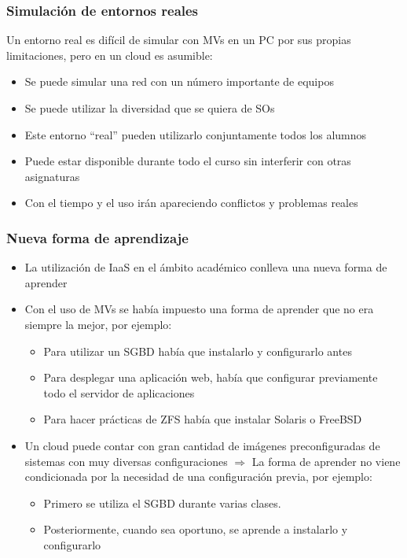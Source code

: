 \documentclass{beamer}
\begin{document}
\begin{frame}
  \frametitle{Simulación de entornos reales}
  Un entorno real es difícil de simular con MVs en un PC por sus
    propias limitaciones, pero en un cloud es asumible:
    \begin{itemize}
    \item Se puede simular una red con un número importante de equipos
    \item Se puede utilizar la diversidad que se quiera de SOs
    \item Este entorno ``real'' pueden utilizarlo conjuntamente todos los
      alumnos
    \item Puede estar disponible durante todo el curso sin interferir con otras
      asignaturas
    \item Con el tiempo y el uso irán apareciendo conflictos y problemas reales
    \end{itemize}
\end{frame}
\begin{frame}
  \frametitle{Nueva forma de aprendizaje}
  \begin{itemize}
  \item La utilización de IaaS en el ámbito académico conlleva una nueva forma
    de aprender
  \item Con el uso de MVs se había impuesto una forma de aprender que no era
    siempre la mejor, por ejemplo:
    \begin{itemize}
    \item Para utilizar un SGBD había que instalarlo y configurarlo antes
    \item Para desplegar una aplicación web, había que configurar previamente
      todo el servidor de aplicaciones
    \item Para hacer prácticas de ZFS había que instalar Solaris o FreeBSD
    \end{itemize}
    \item Un cloud puede contar con gran cantidad de imágenes preconfiguradas de
      sistemas con muy diversas configuraciones $\Rightarrow$ La forma de
      aprender no viene condicionada por la necesidad de una configuración
      previa, por ejemplo:
      \begin{itemize}
      \item Primero se utiliza el SGBD durante varias clases.
      \item Posteriormente, cuando sea oportuno, se aprende a instalarlo y
        configurarlo
      \end{itemize}
  \end{itemize}
\end{frame}
\end{document}
